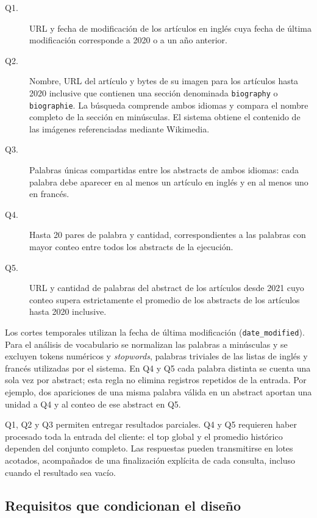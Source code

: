 \begin{description}
    \item[Q1.] URL y fecha de modificación de los artículos en inglés cuya
    fecha de última modificación corresponde a 2020 o a un año anterior.

    \item[Q2.] Nombre, URL del artículo y bytes de su imagen para los artículos
    hasta 2020 inclusive que contienen una sección denominada
    \texttt{biography} o \texttt{biographie}. La búsqueda comprende ambos
    idiomas y compara el nombre completo de la sección en minúsculas.
    El sistema obtiene el contenido de las imágenes referenciadas mediante
    Wikimedia.

    \item[Q3.] Palabras únicas compartidas entre los abstracts de ambos idiomas:
    cada palabra debe aparecer en al menos un artículo en inglés y en al menos
    uno en francés.

    \item[Q4.] Hasta 20 pares de palabra y cantidad, correspondientes a las
    palabras con mayor conteo entre todos los abstracts de la ejecución.

    \item[Q5.] URL y cantidad de palabras del abstract de los artículos desde
    2021 cuyo conteo supera estrictamente el promedio de los abstracts de los
    artículos hasta 2020 inclusive.
\end{description}

Los cortes temporales utilizan la fecha de última modificación
(\texttt{date\_modified}). Para el análisis de vocabulario se normalizan las
palabras a minúsculas y se excluyen tokens numéricos y \emph{stopwords},
palabras triviales de las listas de inglés y francés utilizadas por el sistema.
En Q4 y Q5 cada palabra distinta se cuenta una sola vez por abstract; esta
regla no elimina registros repetidos de la entrada. Por ejemplo, dos apariciones
de una misma palabra válida en un abstract aportan una unidad a Q4 y al conteo
de ese abstract en Q5.

Q1, Q2 y Q3 permiten entregar resultados parciales. Q4 y Q5 requieren haber
procesado toda la entrada del cliente: el top global y el promedio histórico
dependen del conjunto completo. Las respuestas pueden transmitirse en lotes
acotados, acompañados de una finalización explícita de cada consulta, incluso
cuando el resultado sea vacío.

\subsection{Requisitos que condicionan el diseño}

